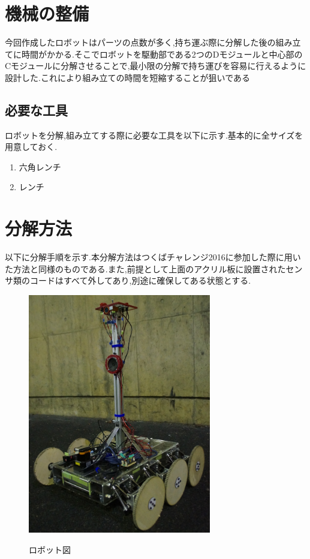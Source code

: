 \mc
\section{機械の整備}
今回作成したロボットはパーツの点数が多く,持ち運ぶ際に分解した後の組み立てに時間がかかる.そこでロボットを駆動部である2つのDモジュールと中心部のCモジュールに分解させることで,最小限の分解で持ち運びを容易に行えるように設計した.これにより組み立ての時間を短縮することが狙いである
\subsection{必要な工具}
ロボットを分解,組み立てする際に必要な工具を以下に示す.基本的に全サイズを用意しておく.
\begin{enumerate}
 \item 六角レンチ
 \item レンチ
\end{enumerate}

\section{分解方法}
以下に分解手順を示す.本分解方法はつくばチャレンジ2016に参加した際に用いた方法と同様のものである.また,前提として上面のアクリル板に設置されたセンサ類のコードはすべて外してあり,別途に確保してある状態とする.
\begin{figure}[htp]
 \begin{center}
  \includegraphics[width=80mm]{img/hard/zentai.jpg}
 　\caption{ロボット図}
  \label{fig:robot}%
 \end{center}
\end{figure}

